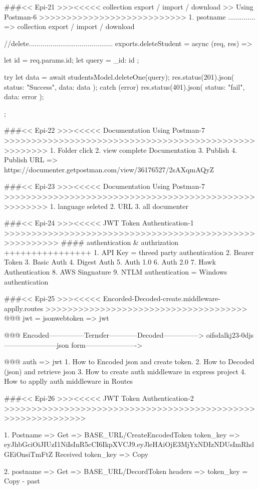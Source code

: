 ###<< Epi-21 >>><<<<< collection export / import / download >> Using Postman-6 >>>>>>>>>>>>>>>>>>>>>>>>>>>
 1. psotname ..............
    => collection export / import / download

  //delete...........................................
  exports.deleteStudent = async (req, res) => {
  let id = req.params.id;
  let query = { _id: id };

  try {
    let data = await studentsModel.deleteOne(query);
    res.status(201).json({ status: "Success", data: data });
  } catch (error) {
    res.status(401).json({ status: "fail", data: error });
  }
};

###<< Epi-22 >>><<<<< Documentation Using Postman-7 >>>>>>>>>>>>>>>>>>>>>>>>>>>>>>>>>>>>>>>>>>>>>>>>>>>>>>
1. Folder click
2. view complete Documentation 
3. Publish 
4. Publish URL => https://documenter.getpostman.com/view/36176527/2sAXqmAQyZ

###<< Epi-23 >>><<<<< Documentation Using Postman-7 >>>>>>>>>>>>>>>>>>>>>>>>>>>>>>>>>>>>>>>>>>>>>>>>>>>>>>
1. language seleted 
2. URL 
3. all documenter

###<< Epi-24 >>><<<<< JWT Token Authentication-1 >>>>>>>>>>>>>>>>>>>>>>>>>>>>>>>>>>>>>>>>>>>>>>>>>>>>>>>>
#### authentication & authrization ++++++++++++++++
1. API Key = threed party authentication
2. Bearer Token
3. Basic Auth
4. Digest Auth
5. Auth 1.0
6. Auth 2.0
7. Hawk Authentication
8. AWS Singnature
9. NTLM authentication = Windows authentication

###<< Epi-25 >>><<<<< Encorded-Decoded-create.middleware-applly.routes >>>>>>>>>>>>>>>>>>>>>>>>>>>>>>>>>>>>>
@@@ jwt = jsonwebtoken => jwt 

@@@ Encoded---------------Ternsfer------------Decoded--------------->
    oifsdalkj23-0djs -----------------------json form---------------------->    

@@@ auth => jwt 
1. How to Encoded json and create token.
2. How to Decoded (json) and retrieve json 
3. How to create auth middleware in express project
4. How to applly auth middleware in Routes

###<< Epi-26 >>><<<<< JWT Token Authentication-2 >>>>>>>>>>>>>>>>>>>>>>>>>>>>>>>>>>>>>>>>>>>>>>>>>>>>>>>>>>>>>

1. Postname => Get =>  {{BASE_URL}}/CreateEncodedToken
   token_key  => eyJhbGciOiJIUzI1NiIsInR5cCI6IkpXVCJ9.eyJleHAiOjE3MjYxNDIzNDUsImRhdGEiOnsiTmFtZ
   Received token_key => Copy

2. postname => Get => {{BASE_URL}}/DecordToken
   headers => token_key = Copy - past 


